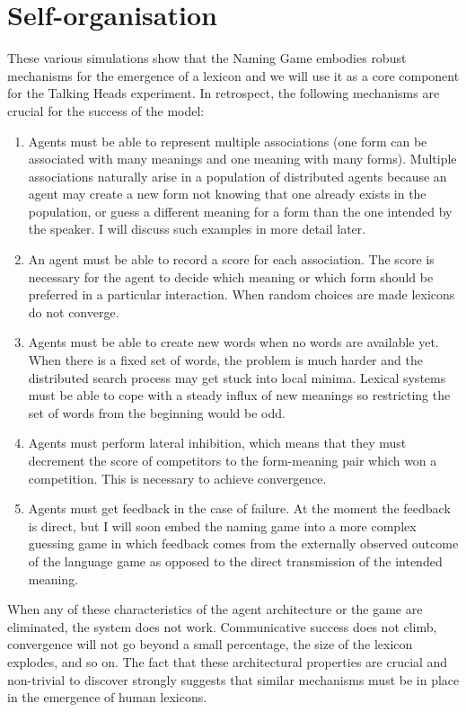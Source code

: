 \section{Self-organisation}

These various simulations show that the Naming Game embodies robust
mechanisms for the emergence of a lexicon and we will use it 
as a core component for the Talking Heads experiment. 
In retrospect, the following mechanisms 
are crucial for the success of the model:
\begin{enumerate}
\item Agents must be able to represent multiple associations
(one form can be associated with many meanings and one
meaning with many forms). Multiple associations 
naturally arise in a population of distributed 
agents because an agent may create a new form not 
knowing that one already exists in the population, or
guess a different meaning for a form than the one
intended by the speaker. I will discuss such examples in
more detail later. 
\item An agent must be able 
to record a score for each association. The score is necessary
for the agent to decide which meaning or which form should 
be preferred in a particular interaction. When random 
choices are made lexicons do not converge. 
\item Agents must be able to create new words when no words are 
available yet. When there is a fixed set of words, the problem 
is much harder and the distributed search 
process may get stuck into local minima. 
Lexical systems must be able to cope with 
a steady influx of new meanings so restricting the set 
of words from the beginning would be odd. 
\item Agents must perform lateral inhibition, which means that 
they must decrement the score of competitors to the
form-meaning pair which won a competition. 
This is necessary to achieve convergence. 
\item Agents must get feedback in the case of failure. At the moment
the feedback is direct, but I will soon embed the naming game
into a more complex guessing game in which feedback comes
from the externally observed outcome of the language 
game as opposed to the direct transmission of the intended meaning. 
\end{enumerate}
When any of these characteristics of the agent
architecture or the game
are eliminated, the system does not work. Communicative success
does not climb, convergence will not go beyond a small percentage, 
the size of the lexicon explodes, and so on. The fact that 
these architectural properties are crucial and non-trivial to 
discover strongly suggests that similar mechanisms must be in 
place in the emergence of human lexicons. 

